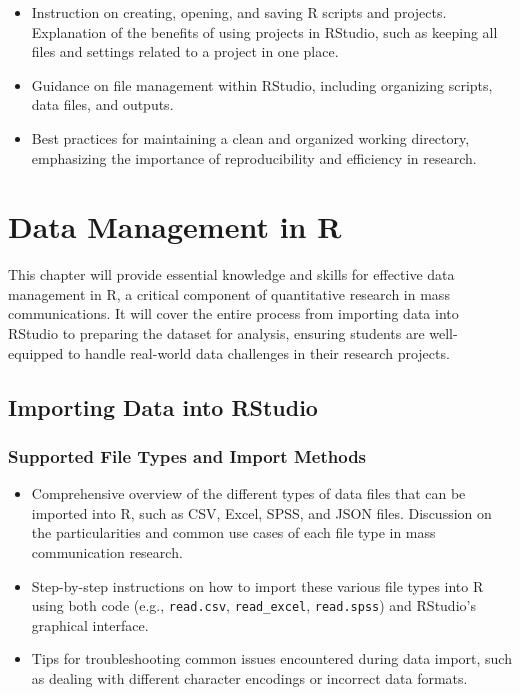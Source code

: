 \documentclass[
]{book}
\begin{document}
\begin{itemize}
\item
  Instruction on creating, opening, and saving R scripts and projects. Explanation of the benefits of using projects in RStudio, such as keeping all files and settings related to a project in one place.
\item
  Guidance on file management within RStudio, including organizing scripts, data files, and outputs.
\item
  Best practices for maintaining a clean and organized working directory, emphasizing the importance of reproducibility and efficiency in research.
\end{itemize}

\hypertarget{data-management-in-r}{%
\chapter*{Data Management in R}\label{data-management-in-r}}

This chapter will provide essential knowledge and skills for effective data management in R, a critical component of quantitative research in mass communications. It will cover the entire process from importing data into RStudio to preparing the dataset for analysis, ensuring students are well-equipped to handle real-world data challenges in their research projects.

\hypertarget{importing-data-into-rstudio}{%
\section*{Importing Data into RStudio}\label{importing-data-into-rstudio}}

\hypertarget{supported-file-types-and-import-methods}{%
\subsection*{Supported File Types and Import Methods}\label{supported-file-types-and-import-methods}}

\begin{itemize}
\item
  Comprehensive overview of the different types of data files that can be imported into R, such as CSV, Excel, SPSS, and JSON files. Discussion on the particularities and common use cases of each file type in mass communication research.
\item
  Step-by-step instructions on how to import these various file types into R using both code (e.g., \texttt{read.csv}, \texttt{read\_excel}, \texttt{read.spss}) and RStudio's graphical interface.
\item
  Tips for troubleshooting common issues encountered during data import, such as dealing with different character encodings or incorrect data formats.
\end{itemize}
\end{document}
